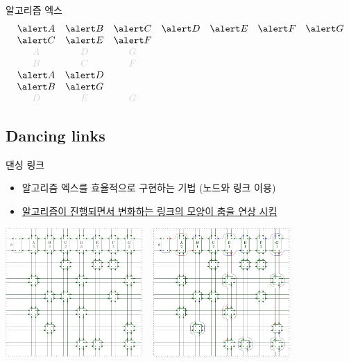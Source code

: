 \documentclass[xcolor=svgnames]{beamer}
\let\a\alert
\def\g{\color{LightGray}}
\begin{document}
%
\begin{frame}{알고리즘 엑스}
\Large\boldmath
$$
  \begin{array}{ccccccc}
    \a A & \a B & \a C & \a D & \a E & \a F & \a G\\
    \a C & \a E & \a F &&&&\\
    \g A & \g D & \g G &&&&\\
    \g B & \g C & \g F &&&&\\
    \a A & \a D &&&&&\\
    \a B & \a G &&&&&\\
    \g D & \g E & \g G &&&&
  \end{array}
  $$
\end{frame}

\subsection{Dancing links}
%
\begin{frame}{댄싱 링크}
  \begin{itemize}
  \item 알고리즘 엑스를 효율적으로 구현하는 기법 (노드와 링크 이용)
  \item \href{https://www.youtube.com/watch?v=pN76VICZiKU&start=100}
    {알고리즘이 진행되면서 변화하는 링크의 모양이 춤을 연상 시킴}
  \end{itemize}
  \begin{center}
    \includegraphics[height=49mm]{imgs/cdance-2.png}
    ~
    \includegraphics[height=49mm]{imgs/cdance-4.png}
  \end{center}
\end{frame}
\end{document}
